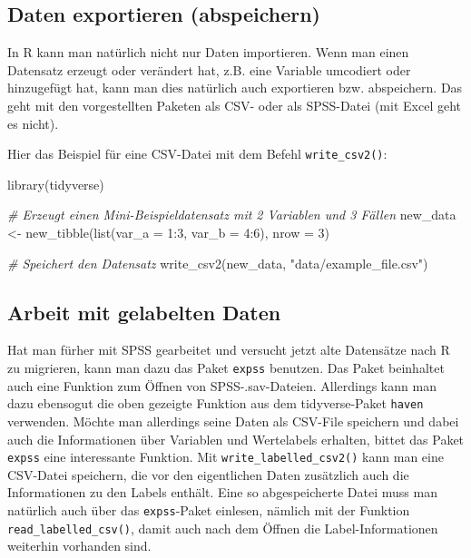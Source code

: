 \documentclass[
]{book}
\newenvironment{Shaded}{\begin{snugshade}}{\end{snugshade}}
\newcommand{\AttributeTok}[1]{\textcolor[rgb]{0.77,0.63,0.00}{#1}}
\newcommand{\CommentTok}[1]{\textcolor[rgb]{0.56,0.35,0.01}{\textit{#1}}}
\newcommand{\DecValTok}[1]{\textcolor[rgb]{0.00,0.00,0.81}{#1}}
\newcommand{\FunctionTok}[1]{\textcolor[rgb]{0.00,0.00,0.00}{#1}}
\newcommand{\NormalTok}[1]{#1}
\newcommand{\OtherTok}[1]{\textcolor[rgb]{0.56,0.35,0.01}{#1}}
\newcommand{\SpecialCharTok}[1]{\textcolor[rgb]{0.00,0.00,0.00}{#1}}
\newcommand{\StringTok}[1]{\textcolor[rgb]{0.31,0.60,0.02}{#1}}
\begin{document}
\hypertarget{daten-exportieren-abspeichern}{%
\subsection{Daten exportieren (abspeichern)}\label{daten-exportieren-abspeichern}}

In R kann man natürlich nicht nur Daten importieren. Wenn man einen Datensatz erzeugt oder verändert hat, z.B. eine Variable umcodiert oder hinzugefügt hat, kann man dies natürlich auch exportieren bzw. abspeichern. Das geht mit den vorgestellten Paketen als CSV- oder als SPSS-Datei (mit Excel geht es nicht).

Hier das Beispiel für eine CSV-Datei mit dem Befehl \texttt{write\_csv2()}:

\begin{Shaded}
\begin{Highlighting}[]
\FunctionTok{library}\NormalTok{(tidyverse)}

\CommentTok{\# Erzeugt einen Mini{-}Beispieldatensatz mit 2 Variablen und 3 Fällen}
\NormalTok{new\_data }\OtherTok{\textless{}{-}} \FunctionTok{new\_tibble}\NormalTok{(}\FunctionTok{list}\NormalTok{(}\AttributeTok{var\_a =} \DecValTok{1}\SpecialCharTok{:}\DecValTok{3}\NormalTok{, }\AttributeTok{var\_b =} \DecValTok{4}\SpecialCharTok{:}\DecValTok{6}\NormalTok{), }\AttributeTok{nrow =} \DecValTok{3}\NormalTok{)}

\CommentTok{\# Speichert den Datensatz}
\FunctionTok{write\_csv2}\NormalTok{(new\_data, }\StringTok{"data/example\_file.csv"}\NormalTok{)}
\end{Highlighting}
\end{Shaded}

\hypertarget{work_labelled}{%
\subsection{Arbeit mit gelabelten Daten}\label{work_labelled}}

Hat man fürher mit SPSS gearbeitet und versucht jetzt alte Datensätze nach R zu migrieren, kann man dazu das Paket \texttt{expss} benutzen. Das Paket beinhaltet auch eine Funktion zum Öffnen von SPSS-.sav-Dateien. Allerdings kann man dazu ebensogut die oben gezeigte Funktion aus dem tidyverse-Paket \texttt{haven} verwenden. Möchte man allerdings seine Daten als CSV-File speichern und dabei auch die Informationen über Variablen und Wertelabels erhalten, bittet das Paket \texttt{expss} eine interessante Funktion. Mit \texttt{write\_labelled\_csv2()} kann man eine CSV-Datei speichern, die vor den eigentlichen Daten zusätzlich auch die Informationen zu den Labels enthält. Eine so abgespeicherte Datei muss man natürlich auch über das \texttt{expss}-Paket einlesen, nämlich mit der Funktion \texttt{read\_labelled\_csv()}, damit auch nach dem Öffnen die Label-Informationen weiterhin vorhanden sind.
\end{document}

